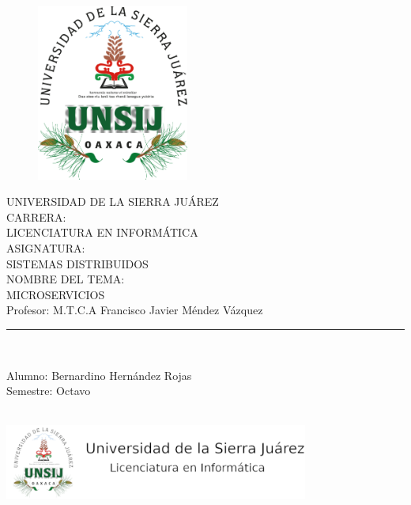 \begin{titlepage}
	
	\begin{center}
		\vspace*{-1in}
		
		\begin{figure}[htb]
			\vspace*{1 in}
			\begin{center}
				\includegraphics[width=5cm]{logo.png}
			\end{center}
		\end{figure}
		\begin{large}
			\vspace*{0.30in}
			UNIVERSIDAD DE LA SIERRA JUÁREZ \\
			
			\vspace*{0.30in}
			CARRERA: \\
			LICENCIATURA EN INFORMÁTICA \\
			
			\vspace*{0.30in}
			ASIGNATURA: \\ SISTEMAS DISTRIBUIDOS \\
			\vspace*{0.2in}
			NOMBRE DEL TEMA:\\ MICROSERVICIOS \\
			\vspace*{0.3in}
			Profesor: M.T.C.A Francisco Javier Méndez Vázquez \\
		\end{large}
		\vspace*{0.1in}
		\rule{130mm}{0.2mm}\\
		\vspace*{0.2 in}
		\begin{large}
			Alumno: Bernardino Hernández Rojas \\
			Semestre: Octavo \\
			\vspace*{0.2in}
			\thedate\\
			
		\end{large}
		\vspace*{1 in}
		\includegraphics[width=10cm]{pie.png}
	\end{center}
\end{titlepage}
